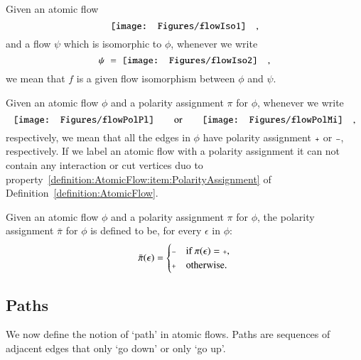 \begin{notation}\label{notation:LabelsIsomorphicFlows}
Given an atomic flow
\[
\vcenter{\hbox{\texttt{[image: Figures/flowIso1]}}}
\quad,
\]
and a flow $\psi$ which is isomorphic to $\phi$, whenever we write
\[
\psi\;=\;
\vcenter{\hbox{\texttt{[image: Figures/flowIso2]}}}
\quad,
\]
we mean that $f$ is a given flow isomorphism between $\phi$ and $\psi$.
\end{notation}

\begin{notation}\label{notation:LabelsFlowPolarity}
Given an atomic flow $\phi$ and a polarity assignment $\pi$ for $\phi$, whenever we write
\[
\vcenter{\hbox{\texttt{[image: Figures/flowPolPl]}}}
\qquad\mbox{or}\qquad
\vcenter{\hbox{\texttt{[image: Figures/flowPolMi]}}}
\quad,
\]
respectively, we mean that all the edges in $\phi$ have polarity assignment $\ppl$ or $\pmi$, respectively.  If we label an atomic flow with a polarity assignment it can not contain any interaction or cut vertices duo to property~\ref{definition:AtomicFlow:item:PolarityAssignment} of Definition~\vref{definition:AtomicFlow}.
\end{notation}

\begin{definition}\label{definition:DualPolarity}
Given an atomic flow $\phi$ and a polarity assignment $\pi$ for $\phi$, the polarity assignment $\bar\pi$ for $\phi$ is defined to be, for every $\epsilon$ in $\phi$:
\[
\bar\pi(\epsilon)=
\begin{cases}
\pmi & \mbox{if $\pi(\epsilon)=\ppl$,}
\\
\ppl & \mbox{otherwise.}
\end{cases}
\]
\end{definition}

\subsection{Paths}\label{subsection:Paths}


We now define the notion of `path' in atomic flows. Paths are sequences of adjacent edges that only `go down' or only `go up'.


